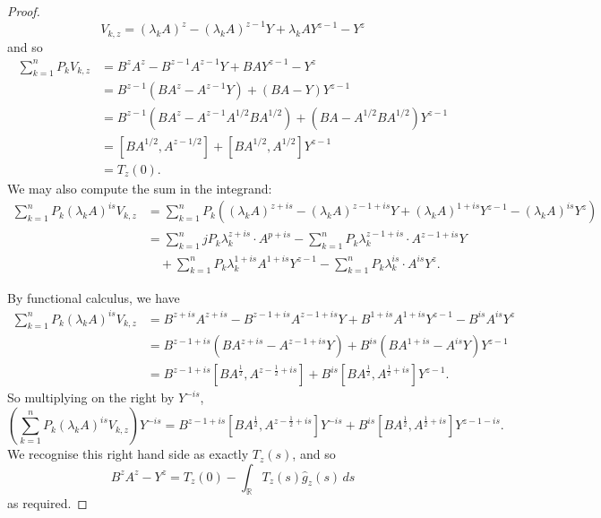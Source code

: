 \begin{proof}
\begin{equation*}
            V_{k,z} = (\lambda_k A)^z-(\lambda_kA)^{z-1}Y+\lambda_kAY^{z-1}-Y^z
        \end{equation*} 
        and so
        \begin{align*}
            \sum_{k=1}^n P_kV_{k,z} &= B^zA^z-B^{z-1}A^{z-1}Y+BAY^{z-1}-Y^z\\
                                    &= B^{z-1}(BA^z-A^{z-1}Y)+(BA-Y)Y^{z-1}\\
                                    &= B^{z-1}(BA^z-A^{z-1}A^{1/2}BA^{1/2})+(BA-A^{1/2}BA^{1/2})Y^{z-1}\\
                                    &= [BA^{1/2},A^{z-1/2}]+[BA^{1/2},A^{1/2}]Y^{z-1}\\
                                    &= T_z(0).
        \end{align*}
        We may also compute the sum in the integrand:
        \begin{align*}
            \sum_{k=1}^nP_k(\lambda_kA)^{is}V_{k,z} &= \sum_{k=1}^n P_k\left((\lambda_k A)^{z+is}-(\lambda_k A)^{z-1+is}Y+(\lambda_k A)^{1+is}Y^{z-1}-(\lambda_k A)^{is}Y^z\right)\\
                                                    &= \sum_{k=1}^njP_k\lambda_k^{z+is}\cdot A^{p+is}-\sum_{k=1}^n P_k\lambda_k^{z-1+is}\cdot A^{z-1+is}Y\\
                                                    &\quad + \sum_{k=1}^n P_k\lambda_k^{1+is} A^{1+is}Y^{z-1}-\sum_{k=1}^n P_k\lambda_k^{is}\cdot A^{is}Y^z.
        \end{align*}
        
        By functional calculus, we have
        \begin{align*}
            \sum_{k=1}^n P_k(\lambda_kA)^{is}V_{k,z} &= B^{z+is}A^{z+is}-B^{z-1+is}A^{z-1+is}Y+B^{1+is}A^{1+is}Y^{z-1}-B^{is}A^{is}Y^z\\
                                                     &= B^{z-1+is}(BA^{z+is}-A^{z-1+is}Y)+B^{is}(BA^{1+is}-A^{is}Y)Y^{z-1}\\
                                                     &= B^{z-1+is}[BA^{\frac12},A^{z-\frac12+is}]+B^{is}[BA^{\frac12},A^{\frac12+is}]Y^{z-1}.
        \end{align*}
        So multiplying on the right by $Y^{-is}$,
        \begin{equation*}
            \left(\sum_{k=1}^n P_k(\lambda_kA)^{is}V_{k,z}\right)Y^{-is} = B^{z-1+is}[BA^{\frac12},A^{z-\frac12+is}]Y^{-is}+B^{is}[BA^{\frac12},A^{\frac12+is}]Y^{z-1-is}.
        \end{equation*}
        We recognise this right hand side as exactly $T_z(s)$, and so 
        \begin{equation*}
            B^zA^z-Y^z = T_z(0)-\int_{\mathbb{R}} T_z(s)\widehat{g}_z(s)\,ds
        \end{equation*}
        as required.
    \end{proof}
    
